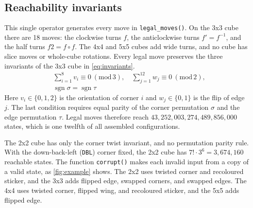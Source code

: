 \documentclass[10pt,twocolumn,letterpaper]{article}
\newcommand{\code}[1]{\texttt{#1}}
\begin{document}
\subsection{Reachability invariants}\label{sec:invariants}
This single operator generates every move in \code{legal\_moves()}. On the 3x3 cube there are 18 moves: the clockwise turns $f$, the anticlockwise turns $f' = f^{-1}$, and the half turns $f2 = f \circ f$. The 4x4 and 5x5 cubes add wide turns, and no cube has slice moves or whole-cube rotations. Every legal move preserves the three invariants of the 3x3 cube in \cref{eq:invariants}.
\begin{equation}
\begin{aligned}
&\textstyle\sum_{i=1}^{8} v_i \equiv 0 \ (\mathrm{mod}\,3), \quad \textstyle\sum_{j=1}^{12} w_j \equiv 0 \ (\mathrm{mod}\,2),\\
&\operatorname{sgn}\sigma = \operatorname{sgn}\tau
\end{aligned}
\label{eq:invariants}
\end{equation}
Here $v_i \in \{0,1,2\}$ is the orientation of corner $i$ and $w_j \in \{0,1\}$ is the flip of edge $j$. The last condition requires equal parity of the corner permutation $\sigma$ and the edge permutation $\tau$. Legal moves therefore reach $43{,}252{,}003{,}274{,}489{,}856{,}000$ states, which is one twelfth of all assembled configurations.

The 2x2 cube has only the corner twist invariant, and no permutation parity rule. With the down-back-left (\code{DBL}) corner fixed, the 2x2 cube has $7! \cdot 3^6 = 3{,}674{,}160$ reachable states. The function \code{corrupt()} makes each invalid input from a copy of a valid state, as \cref{fig:example} shows. The 2x2 uses twisted corner and recoloured sticker, and the 3x3 adds flipped edge, swapped corners, and swapped edges. The 4x4 uses twisted corner, flipped wing, and recoloured sticker, and the 5x5 adds flipped edge.
\end{document}
